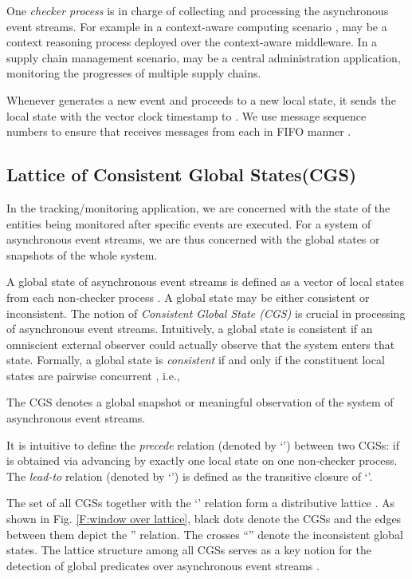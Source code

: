 \documentclass[12pt,journal,letterpaper,compsoc]{IEEEtran}
\begin{document}
One {\it checker process}  is in charge of collecting and processing the asynchronous event streams. For example in a context-aware computing scenario \cite{Huang11},  may be a context reasoning process deployed over the context-aware middleware. In a supply chain management scenario,  may be a central administration application, monitoring the progresses of multiple supply chains.

Whenever  generates a new event and proceeds to a new local state, it sends the local state with the vector clock timestamp to . We use message sequence numbers to ensure that  receives messages from each  in FIFO manner \cite{Garg94, Garg96, Huang09, Huang11}.

\subsection{Lattice of Consistent Global States(CGS)}
\label{sec:lattice}

In the tracking/monitoring application, we are concerned with the state of the entities being monitored after specific events are executed. For a system of asynchronous event streams, we are thus concerned with the global states or snapshots of the whole system.

A global state  of asynchronous event streams is defined as a vector of local states from each non-checker process . A global state may be either consistent or inconsistent. The notion of {\it Consistent Global State (CGS)} is crucial in processing of asynchronous event streams. Intuitively, a global state is consistent if an omniscient external observer could actually observe that the system enters that state. Formally, a global state  is {\it consistent} if and only if the constituent local states are pairwise concurrent \cite{Babaoglu93}, i.e., 

\noindent The CGS denotes a global snapshot or meaningful observation of the system of asynchronous event streams.

It is intuitive to define the {\it precede} relation (denoted by `') between two CGSs:  if  is obtained via advancing  by exactly one local state on one non-checker process. The {\it lead-to} relation (denoted by `') is defined as the transitive closure of `'.

The set of all CGSs together with the `' relation form a distributive lattice \cite{Babaoglu93, Schwarz94}. As shown in Fig. \ref{F:window over lattice}, black dots denote the CGSs and the edges between them depict the '' relation. The crosses ``'' denote the inconsistent global states. The lattice structure among all CGSs serves as a key notion for the detection of global predicates over asynchronous event streams \cite{Babaoglu93, Schwarz94}.
\end{document}
